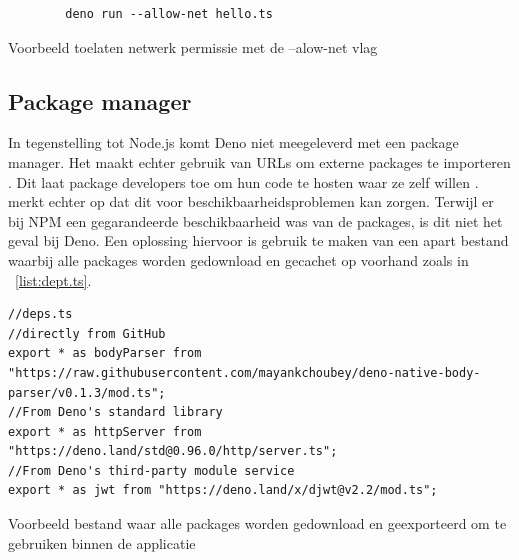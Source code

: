 \begin{listing}[H]
    \centering
    \begin{verbatim}
        deno run --allow-net hello.ts
        \end{verbatim}
        \caption{\label{fig:denocli}Voorbeeld toelaten netwerk permissie met de --alow-net vlag \autocite{DenoLand2023}}
\end{listing}

\subsection{Package manager}
In tegenstelling tot Node.js komt Deno niet meegeleverd met een package manager. 
Het maakt echter gebruik van URLs om externe packages te importeren \autocite{DenoLand2023}.
Dit laat package developers toe om hun code te hosten waar ze zelf willen \autocite{Barrow2022}.
\textcite{Choubey2021} merkt echter op dat dit voor beschikbaarheidsproblemen kan zorgen. 
Terwijl er bij NPM een gegarandeerde beschikbaarheid was van de packages, is dit niet het geval bij Deno.
Een oplossing hiervoor is gebruik te maken van een apart bestand waarbij alle packages worden gedownload en gecachet op voorhand zoals in ~\ref{list:dept.ts}.
\begin{listing}[H]
    \centering
    \begin{verbatim}
//deps.ts
//directly from GitHub
export * as bodyParser from "https://raw.githubusercontent.com/mayankchoubey/deno-native-body-parser/v0.1.3/mod.ts";
//From Deno's standard library
export * as httpServer from "https://deno.land/std@0.96.0/http/server.ts";
//From Deno's third-party module service
export * as jwt from "https://deno.land/x/djwt@v2.2/mod.ts";
        \end{verbatim}
        \caption{\label{list:dept.ts}Voorbeeld bestand waar alle packages worden gedownload en geexporteerd om te gebruiken binnen de applicatie  ~\autocite{Choubey2021}} 
\end{listing}

